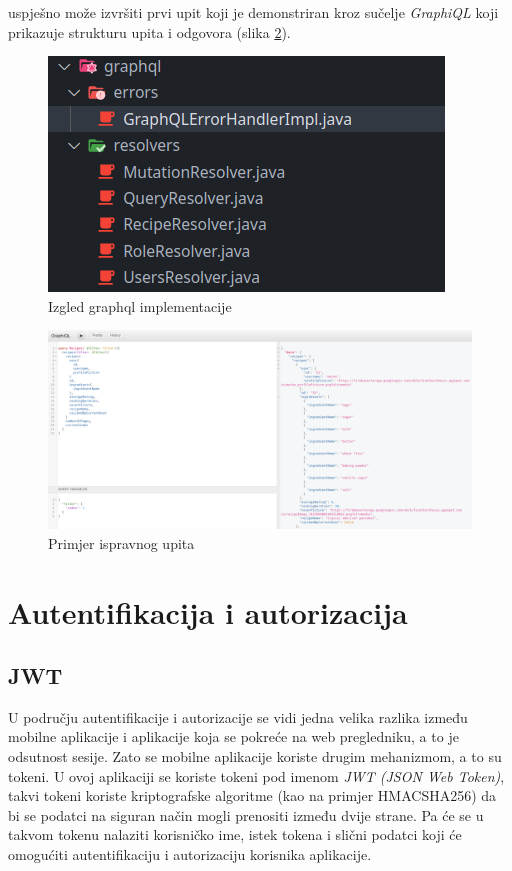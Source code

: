 \documentclass[times, utf8, zavrsni]{fer}
\begin{document}
uspješno može izvršiti prvi upit koji je demonstriran kroz sučelje \textit{GraphiQL} koji
prikazuje strukturu upita i odgovora (slika \ref{fig:GraphQL query}).
\begin{figure}[h]
      \centering
      \includegraphics[width=.5\textwidth]{graphql_implementation_classes.png}
      \caption{Izgled graphql implementacije}
      \label{fig:GraphQL implementation}
\end{figure}
\begin{figure}[h]
      \centering
      \includegraphics[width=\textwidth]{graphql_query.png}
      \caption{Primjer ispravnog upita}
      \label{fig:GraphQL query}
\end{figure}


\section{Autentifikacija i autorizacija}

\subsection{JWT}
U području autentifikacije i autorizacije se vidi jedna velika razlika između mobilne aplikacije i aplikacije koja
se pokreće na web pregledniku, a to je odsutnost sesije. Zato se mobilne aplikacije koriste drugim mehanizmom, a
to su tokeni. U ovoj aplikaciji se koriste tokeni pod imenom \textit{JWT (JSON Web Token)}, takvi tokeni koriste
kriptografske algoritme (kao na primjer HMACSHA256) da bi se podatci na siguran način mogli prenositi između dvije strane.
Pa će se u takvom tokenu nalaziti korisničko ime, istek tokena i slični podatci koji će omogućiti
autentifikaciju i autorizaciju korisnika aplikacije.
\end{document}
